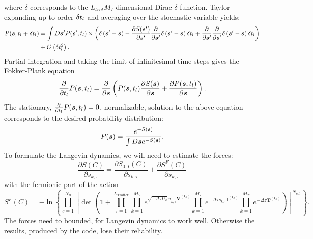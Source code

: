 where $\delta$ corresponds to the $L_{trot} M_I $  dimensional Dirac $\delta$-function.   Taylor expanding  up to order $\delta t_{l}$  and averaging over the stochastic variable yields:
\begin{align}
P(\boldsymbol{s}, t_{l}  + \delta t_{l} ) &  = \int D\boldsymbol{s'}  P  (\boldsymbol{s}', t_{l}  )   \times \left(   \delta \left(  \boldsymbol{s}' - \boldsymbol{s}   \right)
- \frac{\partial S(\boldsymbol{s'}) }{\partial    \boldsymbol{s'} }   \frac{\partial  }{\partial    \boldsymbol{s'} } \delta \left(  \boldsymbol{s}' - \boldsymbol{s} \right)  \delta t_{l}   +
   \frac{\partial  }{\partial    \boldsymbol{s'} }   \frac{\partial  }{\partial    \boldsymbol{s}' }  \delta \left(  \boldsymbol{s}' - \boldsymbol{s}\right)    \delta t_{l}
\right)  \nonumber   \\
  &  + {\cal O}  \left(  \delta t_{l}^2 \right).
\end{align}
Partial integration  and taking the limit of infinitesimal time steps   gives the Fokker-Plank equation
\begin{equation}
         \frac{\partial  }{\partial   t_{l}}  P( \boldsymbol{s}, t_{l})  =  \frac{\partial  }{\partial    \boldsymbol{s} }  \left( P( \boldsymbol{s}, t_{l})  \frac{\partial S(\boldsymbol{s}) }{\partial     \boldsymbol{s} }   +
          \frac{\partial P(\boldsymbol{s},t_{l}) }{\partial     \boldsymbol{s} }
         \right) .
\end{equation}
The stationary,  $ \frac{\partial  }{\partial   t_{l}}  P( \boldsymbol{s}, t_{l}) =0$,  normalizable,  solution to the above equation corresponds to the desired probability distribution:
\begin{equation}
          P(\boldsymbol{s}) =  \frac{ e^{ - S(\boldsymbol{s}) } }   {   \int D \boldsymbol{s}  e^{ - S(\boldsymbol{s}) } }.
\end{equation}
To formulate  the Langevin dynamics, we will need  to estimate the forces:
\begin{equation}
	\frac { \partial S(C)}{\partial s_{k,\tau} } =\frac { \partial S_{0,I}(C)}{\partial s_{k,\tau} } +  \frac { \partial S^F(C)}{\partial s_{k,\tau} }
\end{equation}
with the fermionic part of the action 
\begin{equation}
S^F(C) = - \ln{ \left\{
  \prod_{s=1}^{N_{\mathrm{fl}}}\left[\det\left(  \mathds{1} + 
     \prod_{\tau=1}^{L_{\mathrm{Trotter}}}   
 \prod_{k=1}^{M_V}   e^{  \sqrt{ -\Delta \tau  U_k} \eta_{k,\tau} {\bm V}^{(ks)} }   \prod_{k=1}^{M_I}   e^{  -\Delta \tau s_{k,\tau}  {\bm I}^{(ks)}}  
     \prod_{k=1}^{M_T}   e^{-\Delta \tau {\bm T}^{(ks)}} 
     \right) \right]^{N_{\mathrm{col}}} \right\}} .
\end{equation} 
The forces need to bounded, for Langevin dynamics to work well. Otherwise the results, produced by the code, lose their reliability. 

